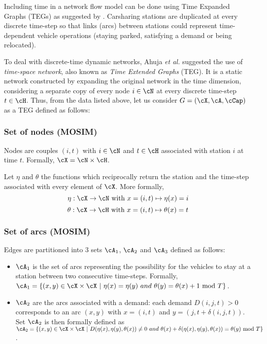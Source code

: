 \begin{bibunit}[ieeetr]
Including time in a network flow model can be done using Time Expanded Graphs (TEGs) as suggested by \cite{ahuja1993}.
Carsharing stations are duplicated at every discrete time-step so that links (arcs) between stations could represent time-dependent vehicle operations (staying parked, satisfying a demand or being relocated).

To deal with discrete-time dynamic networks, Ahuja {\em et al.} \cite{ahujaNetwork1993} suggested the use of \emph{time-space network}, also known as \emph{Time Extended Graphs} (TEG). 
It is  a static network constructed by expanding the original network in the time dimension, considering a separate copy of every node $i \in \cN$ at every discrete time-step $t \in \cH$. Thus, from the data listed above, let us  consider $G = ({\cX}, {\cA}, \cCap)$ as a TEG defined as follows:

\subsubsection{Set of nodes (MOSIM)}
Nodes are couples $(i,t)$ with $i \in \cN$ and $t \in \cH$ associated with station $i$ at time $t$. Formally, $\cX = \cN \times \cH$.

Let $\eta$ and $\theta$ the functions which reciprocally return the station and the time-step associated with every element of $\cX$. More formally,
$$\eta:  {\cX  \rightarrow  \cN} \mbox{ with }  x=(i,t) \mapsto \eta(x)=i$$
$$\theta: { \cX \rightarrow  \cH} \mbox{ with } x=(i,t) \mapsto \theta(x)=t$$

\subsubsection{Set of arcs (MOSIM)}
Edges are partitioned into $3$ sets ${\cA}_1$, ${\cA}_2$ and ${\cA}_3$ defined as follows:
\begin{itemize}
\item 
${\cA}_1$ is the set of arcs representing the possibility for the vehicles to stay at a station between two consecutive time-steps.
Formally, 
${\cA}_1 = \{(x,y) \in {\cX} \times {\cX} ~|~ \eta(x) = \eta(y) ~and~ \theta(y) = \theta(x) + 1 \mbox{ mod } T\}$.

\item 
${\cA}_2$ are the arcs associated with a demand: each demand $D(i,j,t)>0$ corresponds to an arc  $(x,y)$ with
$x = (i, t)$ and $y = (j, t + \delta(i,j,t))$. Set ${\cA}_2$ is then formally defined as
${\cA}_2 = \{(x,y) \in {\cX} \times {\cX} ~|~ D(\eta(x), \eta(y), \theta(x)) \not = 0 ~and~ \theta(x) + \delta(\eta(x), \eta(y), \theta(x)) = \theta(y)\mbox{ mod } T\}$.


\end{itemize}
\end{bibunit}
